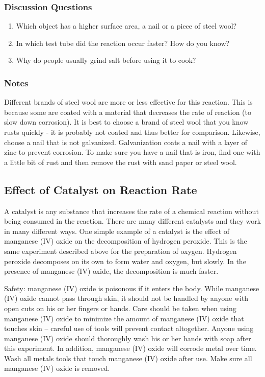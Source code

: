 \subsubsection*{Discussion Questions}
\begin{enumerate}
\item{Which object has a higher surface area, a nail or a piece of steel wool?}
\item{In which test tube did the reaction occur faster? How do you know?}
\item{Why do people usually grind salt before using it to cook?}
\end{enumerate}

\subsubsection*{Notes}
Different brands of steel wool are more or less effective for this reaction. This is because some are coated with a material that decreases the rate of reaction (to slow down corrosion). It is best to choose a brand of steel wool that you know rusts quickly - it is probably not coated and thus better for comparison. Likewise, choose a nail that is not galvanized. Galvanization coats a nail with a layer of zinc to prevent corrosion. To make sure you have a nail that is iron, find one with a little bit of rust and then remove the rust with sand paper or steel wool.

\subsection{Effect of Catalyst on Reaction Rate}

A catalyst is any substance that increases the rate of a chemical reaction without being consumed in the reaction. There are many different catalysts and they work in many different ways. One simple example of a catalyst is the effect of manganese (IV) oxide on the decomposition of hydrogen peroxide. This is the same experiment described above for the preparation of oxygen. Hydrogen peroxide decomposes on its own to form water and oxygen, but slowly. In the presence of manganese (IV) oxide, the decomposition is much faster.

Safety: manganese (IV) oxide is poisonous if it enters the body. While manganese (IV) oxide cannot pass through skin, it should not be handled by anyone with open cuts on his or her fingers or hands. Care should be taken when using manganese (IV) oxide to minimize the amount of manganese (IV) oxide that touches skin – careful use of tools will prevent contact altogether. Anyone using manganese (IV) oxide should thoroughly wash his or her hands with soap after this experiment. In addition, manganese (IV) oxide will corrode metal over time. Wash all metals tools that touch manganese (IV) oxide after use. Make sure all manganese (IV) oxide is removed.

